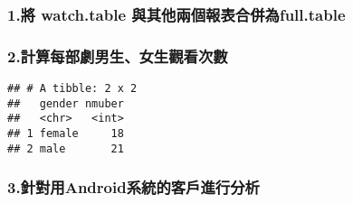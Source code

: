 \documentclass[]{article}
\newenvironment{Shaded}{\begin{snugshade}}{\end{snugshade}}
\newcommand{\DataTypeTok}[1]{\textcolor[rgb]{0.13,0.29,0.53}{#1}}
\newcommand{\KeywordTok}[1]{\textcolor[rgb]{0.13,0.29,0.53}{\textbf{#1}}}
\newcommand{\NormalTok}[1]{#1}
\newcommand{\OperatorTok}[1]{\textcolor[rgb]{0.81,0.36,0.00}{\textbf{#1}}}
\newcommand{\StringTok}[1]{\textcolor[rgb]{0.31,0.60,0.02}{#1}}
\begin{document}
\hypertarget{ux5c07-watch.table-ux8207ux5176ux4ed6ux5169ux500bux5831ux8868ux5408ux4f75ux70bafull.table}{%
\subsubsection{\texorpdfstring{\textbf{1.將 watch.table
與其他兩個報表合併為full.table}}{1.將 watch.table 與其他兩個報表合併為full.table}}\label{ux5c07-watch.table-ux8207ux5176ux4ed6ux5169ux500bux5831ux8868ux5408ux4f75ux70bafull.table}}

\begin{Shaded}
\end{Shaded}

\hypertarget{ux8a08ux7b97ux6bcfux90e8ux5287ux7537ux751fux5973ux751fux89c0ux770bux6b21ux6578}{%
\subsubsection{\texorpdfstring{\textbf{2.計算每部劇男生、女生觀看次數}}{2.計算每部劇男生、女生觀看次數}}\label{ux8a08ux7b97ux6bcfux90e8ux5287ux7537ux751fux5973ux751fux89c0ux770bux6b21ux6578}}

\begin{Shaded}
\end{Shaded}

\begin{verbatim}
## # A tibble: 2 x 2
##   gender nmuber
##   <chr>   <int>
## 1 female     18
## 2 male       21
\end{verbatim}

\hypertarget{ux91ddux5c0dux7528androidux7cfbux7d71ux7684ux5ba2ux6236ux9032ux884cux5206ux6790}{%
\subsubsection{\texorpdfstring{\textbf{3.針對用Android系統的客戶進行分析}}{3.針對用Android系統的客戶進行分析}}\label{ux91ddux5c0dux7528androidux7cfbux7d71ux7684ux5ba2ux6236ux9032ux884cux5206ux6790}}
\end{document}
